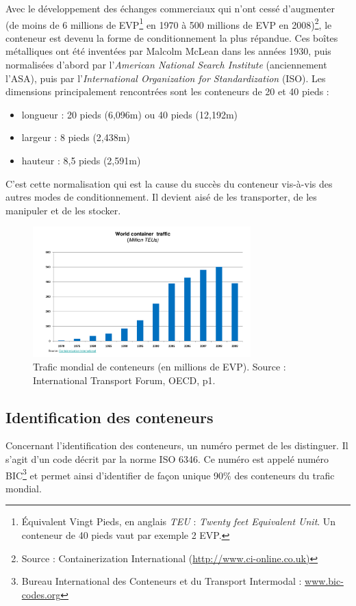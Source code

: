 
Avec le développement des échanges commerciaux qui n'ont cessé d'augmenter (de moins de 6 millions de EVP\footnote{Équivalent Vingt Pieds, en anglais \textit{TEU} : \textit{Twenty feet Equivalent Unit}. Un conteneur de 40 pieds vaut par exemple 2 EVP.} en 1970 à 500 millions de EVP en 2008)\footnote{Source : Containerization International (\url{http://www.ci-online.co.uk)}}, le conteneur est devenu la forme de conditionnement la plus répandue. Ces boîtes métalliques ont été inventées par Malcolm McLean dans les années 1930, puis normalisées d'abord par l'\textit{American National Search Institute} (anciennement l'ASA), puis par l'\textit{International Organization for Standardization} (ISO). Les dimensions principalement rencontrées sont les conteneurs de 20 et 40 pieds :
\begin{itemize}
 \item longueur : 20 pieds (6,096m) ou 40 pieds (12,192m)
 \item largeur : 8 pieds (2,438m)
 \item hauteur : 8,5 pieds (2,591m)
\end{itemize}
C'est cette normalisation qui est la cause du succès du conteneur vis-à-vis des autres modes de conditionnement. Il devient aisé de les transporter, de les manipuler et de les stocker.

\begin{figure}
 \label{fig:worldContainerTraffic}
 \begin{center}
 \includegraphics[width=0.75\textwidth]{chapitres/application/worldContainerTraffic.png}
 \caption{Trafic mondial de conteneurs (en millions de EVP). Source : International Transport Forum, OECD, p1.}
 \end{center}
\end{figure}

\subsection*{Identification des conteneurs}
Concernant l'identification des conteneurs, un numéro permet de les distinguer. Il s'agit d'un code décrit par la norme ISO 6346. Ce numéro est appelé numéro BIC\footnote{Bureau International des Conteneurs et du Transport Intermodal : \url{www.bic-codes.org}} et permet ainsi d'identifier de façon unique 90\% des conteneurs du trafic mondial.

